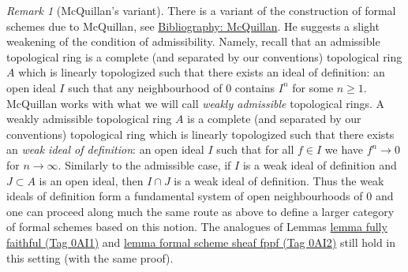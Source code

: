 \documentclass{amsart}
\theoremstyle{plain}
\theoremstyle{definition}
\theoremstyle{remark}
\newtheorem{remark}[subsection]{Remark}
\numberwithin{equation}{subsection}
\begin{document}
\begin{remark}[McQuillan's variant]
\label{remark-mcquillan}
There is a variant of the construction of formal schemes due to
McQuillan, see \href{https://stacks.math.columbia.edu/bibliography}{Bibliography: McQuillan}.
He suggests a slight weakening of the condition of admissibility.
Namely, recall that an admissible topological ring is a complete
(and separated by our conventions) topological ring $A$
which is linearly topologized such that there exists an
ideal of definition: an
open ideal $I$ such that any neighbourhood of $0$ contains $I^n$
for some $n \geq 1$.
McQuillan works with what we will call {\it weakly admissible}
topological rings. A weakly admissible topological ring $A$ is a
complete (and separated by our conventions) topological ring
which is linearly topologized such that there exists an
{\it weak ideal of definition}: an open ideal $I$ such that
for all $f \in I$ we have
$f^n \to 0$ for $n \to \infty$. Similarly to the admissible case,
if $I$ is a weak ideal of definition and $J \subset A$ is an
open ideal, then $I \cap J$ is a weak ideal of definition.
Thus the weak ideals of definition form a fundamental system of
open neighbourhoods of $0$ and
one can proceed along much the same route as above
to define a larger category of formal schemes based
on this notion. The analogues of Lemmas \href{https://stacks.math.columbia.edu/tag/0AI1}{lemma fully faithful (Tag 0AI1)} and
\href{https://stacks.math.columbia.edu/tag/0AI2}{lemma formal scheme sheaf fppf (Tag 0AI2)}
still hold in this setting (with the same proof).
\end{remark}
\end{document}
